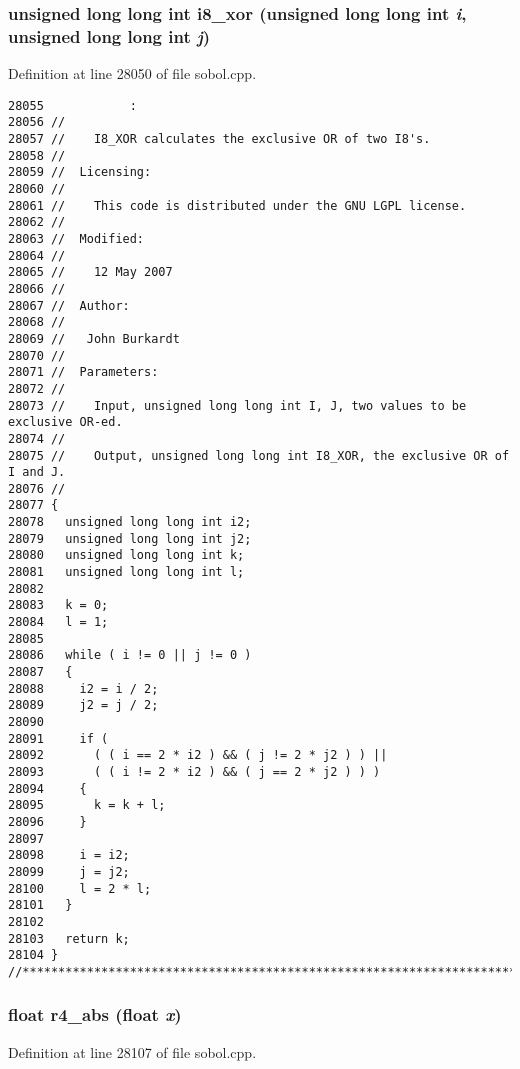 \subsubsection{\setlength{\rightskip}{0pt plus 5cm}unsigned long long int i8\_\-xor (unsigned long long int {\em i}, unsigned long long int {\em j})}\label{test_2sobol_8H_fdd081f172ecb01ebb6ab7dbdb23be95}




Definition at line 28050 of file sobol.cpp.

\begin{Code}\begin{verbatim}28055            :
28056 //
28057 //    I8_XOR calculates the exclusive OR of two I8's.
28058 //
28059 //  Licensing:
28060 //
28061 //    This code is distributed under the GNU LGPL license. 
28062 //
28063 //  Modified:
28064 //
28065 //    12 May 2007
28066 //
28067 //  Author:
28068 //
28069 //   John Burkardt
28070 //
28071 //  Parameters:
28072 //
28073 //    Input, unsigned long long int I, J, two values to be exclusive OR-ed.
28074 //
28075 //    Output, unsigned long long int I8_XOR, the exclusive OR of I and J.
28076 //
28077 {
28078   unsigned long long int i2;
28079   unsigned long long int j2;
28080   unsigned long long int k;
28081   unsigned long long int l;
28082 
28083   k = 0;
28084   l = 1;
28085 
28086   while ( i != 0 || j != 0 )
28087   {
28088     i2 = i / 2;
28089     j2 = j / 2;
28090 
28091     if ( 
28092       ( ( i == 2 * i2 ) && ( j != 2 * j2 ) ) ||
28093       ( ( i != 2 * i2 ) && ( j == 2 * j2 ) ) )
28094     {
28095       k = k + l;
28096     }
28097 
28098     i = i2;
28099     j = j2;
28100     l = 2 * l;
28101   }
28102 
28103   return k;
28104 }
//****************************************************************************80
\end{verbatim}
\end{Code}


\subsubsection{\setlength{\rightskip}{0pt plus 5cm}float r4\_\-abs (float {\em x})}\label{test_2sobol_8H_5c1bb00b7d83fa1723180a27a5d252e8}




Definition at line 28107 of file sobol.cpp.


